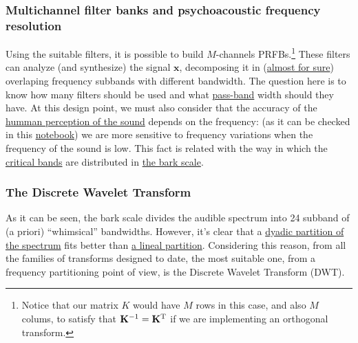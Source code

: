 
\subsubsection{Multichannel filter banks and psychoacoustic frequency resolution}

Using the suitable filters, it is possible to build $M$-channels
PRFBs.\footnote{Notice that our matrix $K$ would have $M$ rows in this
  case, and also $M$ colums, to satisfy that
  ${\mathbf K}^{-1}={\mathbf K}^{\text T}$ if we are implementing an
  orthogonal transform.}  These filters can analyze (and synthesize)
the signal ${\mathbf x}$, decomposing it in
(\href{https://en.wikipedia.org/wiki/Low-pass_filter#Ideal_and_real_filters}{almost
  for sure}) overlaping frequency subbands with different
bandwidth. The question here is to know how many filters should be
used and what
\href{https://en.wikipedia.org/wiki/Band-pass_filter}{pass-band} width
should they have. At this design point, we must also consider that the
accuracy of the
\href{https://en.wikipedia.org/wiki/Psychoacoustics}{humman perception
  of the sound} depends on the frequency: (as it can be checked in
this
\href{https://github.com/Tecnologias-multimedia/intercom/blob/master/docs/frequency_resolution.ipynb}{notebook})
we are more sensitive to frequency variations when the frequency of
the sound is low. This fact is related with the way in which the
\href{https://en.wikipedia.org/wiki/Critical_band}{critical bands} are
distributed in \href{https://en.wikipedia.org/wiki/Bark_scale}{the
  bark scale}.


\subsubsection{The Discrete Wavelet Transform}

As it can be seen, the bark scale divides the audible spectrum into 24
subband of (a priori) ``whimsical'' bandwidths. However, it's clear
that a \href{https://en.wikipedia.org/wiki/Octave_band}{dyadic
  partition of the spectrum} fits better than
\href{https://en.wikipedia.org/wiki/Wavelet_transform#Principle}{a
  lineal partition}. Considering this reason, from all the families of
transforms designed to date, the most suitable one, from a frequency
partitioning point of view, is the Discrete Wavelet Transform (DWT).

